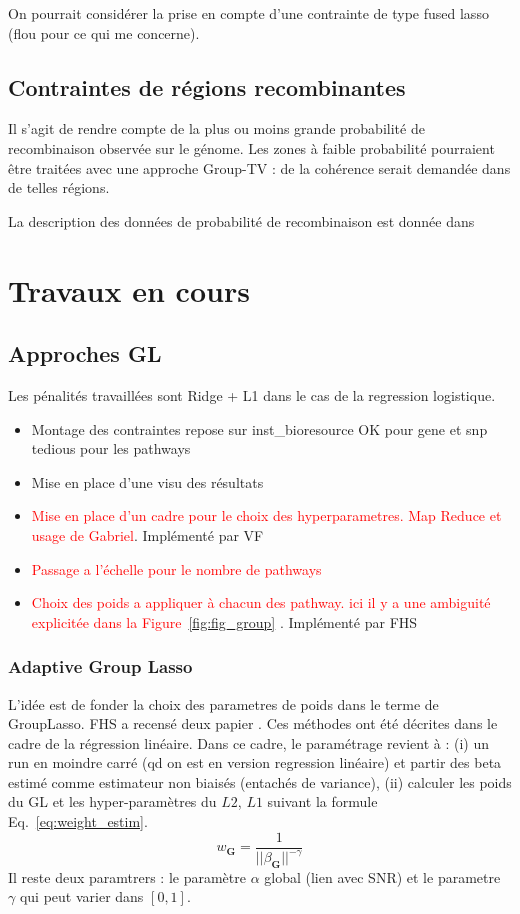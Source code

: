 \documentclass[french]{article}
\newcommand{\eqref}[1]{Eq.~\ref{#1}}
\newcommand{\figref}[1]{Figure~\ref{#1}}
\begin{document}
On pourrait considérer la prise en compte d'une contrainte de type fused lasso (flou pour ce qui me concerne).

\subsection{Contraintes de régions recombinantes}
Il s'agit de rendre compte de la plus ou moins grande probabilité de recombinaison observée sur le génome. Les zones à faible probabilité pourraient être traitées avec une approche Group-TV : de la cohérence serait demandée dans de telles régions.

La description des données de probabilité de recombinaison est donnée dans 

\section{Travaux en cours}
\subsection{Approches GL}

Les pénalités travaillées sont Ridge + L1 dans le cas de la regression logistique.
\begin{itemize}
\item Montage des contraintes repose sur inst\_bioresource OK pour gene et snp tedious pour les pathways
\item Mise en place d'une visu des résultats
\item \textcolor{red}{Mise en place d'un cadre pour le choix des hyperparametres. Map Reduce et usage de Gabriel}. Implémenté par VF
\item \textcolor{red}{Passage a l'échelle pour le nombre de pathways}
\item \textcolor{red}{Choix des poids a appliquer à chacun des pathway. ici il y a une ambiguité explicitée dans la \figref{fig:fig_group} }. Implémenté par FHS
\end{itemize}

\subsubsection{Adaptive Group Lasso}
L'idée est de fonder la choix des parametres de poids dans le terme de GroupLasso. FHS a recensé deux papier \cite{Wang2008,Huang2012}. Ces méthodes ont été décrites dans le cadre de la régression linéaire. Dans ce cadre, le paramétrage revient à :
(i) un run en moindre carré (qd on est en version regression linéaire) et partir des beta estimé comme estimateur non biaisés (entachés de variance), (ii) calculer les poids du GL et les hyper-paramètres du $L2$, $L1$ suivant la formule \eqref{eq:weight_estim}.
\begin{equation}\label{eq:weight_estim}
    w_{\mathbf{G}} = \frac{1}{||\beta_{\mathbf{G}}||^{-\gamma}}
\end{equation}
Il reste deux paramtrers : le paramètre $\alpha$ global (lien avec SNR) et le parametre $\gamma$ qui peut varier dans $\left [0, 1\right]$. 
\end{document}
